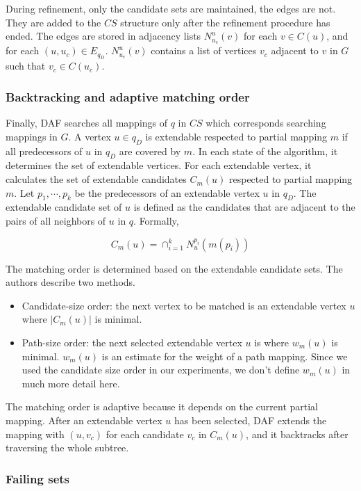 During refinement, only the candidate sets are maintained, the edges are not. They are added to the $CS$
structure only after the refinement procedure has ended. The edges are stored in adjacency lists $N^u_{u_c}(v)$
for each $v \in C(u)$, and for each $(u, u_c) \in E_{q_D}$. $N^u_{u_c}(v)$ contains a list of vertices $v_c$
adjacent to $v$ in $G$ such that $v_c \in C(u_c)$.

\subsubsection{Backtracking and adaptive matching order}

Finally, DAF searches all mappings of $q$ in $CS$ which corresponds searching mappings in $G$. A vertex $u \in q_D$
is extendable respected to partial mapping $m$ if all predecessors of $u$ in $q_D$ are covered by $m$. In each state
of the algorithm, it determines the set of extendable vertices. For each extendable vertex, it calculates the set of
extendable candidates $C_m(u)$ respected to partial mapping $m$. Let $p_1, \cdots, p_k$ be the predecessors of an
extendable vertex $u$ in $q_D$. The extendable candidate set of $u$ is defined as the candidates that are adjacent to
the pairs of all neighbors of $u$ in $q$. Formally,

\[ C_m(u) = \cap^k_{i=1} N^{p_i}_u(m(p_i)) \]

The matching order is determined based on the extendable candidate sets. The authors describe two methods.
\begin{itemize}
    \item Candidate-size order: the next vertex to be matched is an extendable vertex $u$ where $|C_m(u)|$ is minimal.
    \item Path-size order: the next selected extendable vertex $u$ is where $w_m(u)$ is minimal. $w_m(u)$ is an estimate for the weight of a path mapping. Since we used the candidate size order in our experiments, we don't define $w_m(u)$ in much more detail here.
\end{itemize}

The matching order is adaptive because it depends on the current partial mapping. After an extendable vertex $u$
has been selected, DAF extends the mapping with $(u, v_c)$ for each candidate $v_c$ in $C_m(u)$, and it backtracks
after traversing the whole subtree.

\subsubsection{Failing sets}

